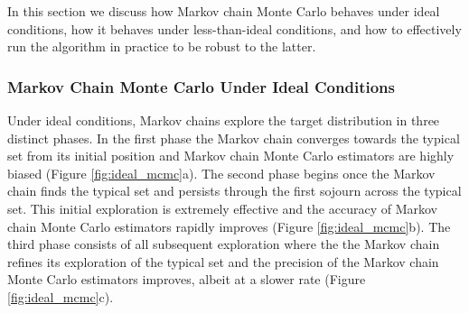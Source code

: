 \documentclass[11pt, oneside]{article}
\begin{document}
In this section we discuss how Markov chain Monte Carlo
behaves under ideal conditions, how it behaves under
less-than-ideal conditions, and how to effectively run
the algorithm in practice to be robust to the latter.

\subsubsection{Markov Chain Monte Carlo Under Ideal Conditions}

Under ideal conditions, Markov chains explore the target
distribution in three distinct phases.  In the first phase the
Markov chain converges towards the typical set from its
initial position and Markov chain Monte Carlo estimators
are highly biased (Figure \ref{fig:ideal_mcmc}a).  The
second phase begins once the Markov chain finds the
typical set and persists through the first sojourn across
the typical set.  This initial exploration is extremely effective
and the accuracy of Markov chain Monte Carlo estimators
rapidly improves (Figure \ref{fig:ideal_mcmc}b).  The
third phase consists of all subsequent exploration where
the the Markov chain refines its exploration of the typical
set and the precision of the Markov chain Monte Carlo 
estimators improves, albeit at a slower rate (Figure 
\ref{fig:ideal_mcmc}c).
\end{document}
